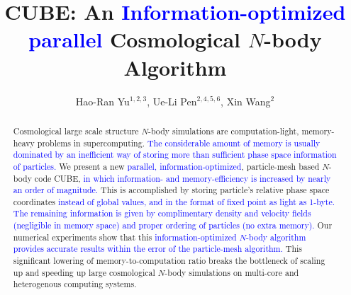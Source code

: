 \documentclass[10pt,twocolumn,preprint]{emulateapj}
\newcommand{\tcb}{\textcolor{blue}}
\begin{document}
\title{CUBE: An \tcb{Information-optimized parallel} Cosmological $N$-body Algorithm}
\author{
Hao-Ran Yu$^{1,2,3}$,
Ue-Li Pen$^{2,4,5,6}$,
Xin Wang$^{2}$
}


 
\begin{abstract}
Cosmological large scale structure $N$-body simulations are computation-light, memory-heavy problems in supercomputing. \tcb{The considerable amount of memory is usually dominated by an inefficient way of storing more than sufficient phase space information of particles.} We present a new \tcb{parallel, information-optimized}, particle-mesh based $N$-body code CUBE, \tcb{in which information- and memory-efficiency is increased by nearly an order of magnitude.} This is accomplished by storing particle's relative phase space coordinates \tcb{instead of global values, and in the format of fixed point as light as 1-byte. The remaining information is given by complimentary density and velocity fields (negligible in memory space) and proper ordering of particles (no extra memory).} Our numerical experiments show that this \tcb{information-optimized $N$-body algorithm provides accurate results within the error of the particle-mesh algorithm.} This significant lowering of memory-to-computation ratio breaks the bottleneck of scaling up and speeding up large cosmological $N$-body simulations on multi-core and heterogenous computing systems.

\end{abstract}

\keywords{}

\maketitle
\end{document}
